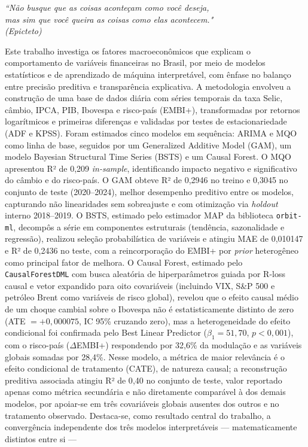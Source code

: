 \documentclass[	12pt, Times, openright, oneside, a4paper, english, brazil]{abntex2}
\begin{document}
\begin{epigrafe}
    \vspace*{\fill}
	\begin{flushright}
		\textit{``Não busque que as coisas aconteçam como você deseja, \\
		mas sim que você queira as coisas como elas acontecem."\\
		(Epicteto)}
	\end{flushright}
\end{epigrafe}


\begin{resumo}
Este trabalho investiga os fatores macroeconômicos que explicam o comportamento de variáveis financeiras no Brasil, por meio de modelos estatísticos e de aprendizado de máquina interpretável, com ênfase no balanço entre precisão preditiva e transparência explicativa. A metodologia envolveu a construção de uma base de dados diária com séries temporais da taxa Selic, câmbio, IPCA, PIB, Ibovespa e risco-país (EMBI+), transformadas por retornos logarítmicos e primeiras diferenças e validadas por testes de estacionariedade (ADF e KPSS). Foram estimados cinco modelos em sequência: ARIMA e MQO como linha de base, seguidos por um Generalized Additive Model (GAM), um modelo Bayesian Structural Time Series (BSTS) e um Causal Forest. O MQO apresentou R² de 0{,}209 \textit{in-sample}, identificando impacto negativo e significativo do câmbio e do risco-país. O GAM obteve R² de 0{,}2946 no treino e 0{,}3045 no conjunto de teste (2020--2024), melhor desempenho preditivo entre os modelos, capturando não linearidades sem sobreajuste e com otimização via \textit{holdout} interno 2018--2019. O BSTS, estimado pelo estimador MAP da biblioteca \texttt{orbit-ml}, decompôs a série em componentes estruturais (tendência, sazonalidade e regressão), realizou seleção probabilística de variáveis e atingiu MAE de 0{,}010147 e R² de 0{,}2436 no teste, com a reincorporação do EMBI+ por \textit{prior} heterogêneo como principal fator de melhora. O Causal Forest, estimado pelo \texttt{CausalForestDML} com busca aleatória de hiperparâmetros guiada por R-loss causal e vetor expandido para oito covariáveis (incluindo VIX, S\&P 500 e petróleo Brent como variáveis de risco global), revelou que o efeito causal médio de um choque cambial sobre o Ibovespa não é estatisticamente distinto de zero (ATE $= +0{,}000075$, IC 95\% cruzando zero), mas a heterogeneidade do efeito condicional foi confirmada pelo Best Linear Predictor ($\beta_1 = 51{,}70$, $p < 0{,}001$), com o risco-país ($\Delta$EMBI+) respondendo por 32,6\% da modulação e as variáveis globais somadas por 28,4\%. Nesse modelo, a métrica de maior relevância é o efeito condicional de tratamento (CATE), de natureza causal; a reconstrução preditiva associada atingiu R² de 0{,}40 no conjunto de teste, valor reportado apenas como métrica secundária e não diretamente comparável à dos demais modelos, por apoiar-se em três covariáveis globais ausentes dos outros e no tratamento observado. Destaca-se, como resultado central do trabalho, a convergência independente dos três modelos interpretáveis — matematicamente distintos entre si — 
\end{resumo}
\end{document}
